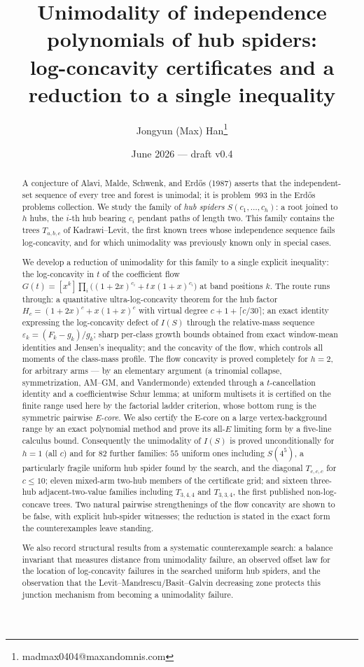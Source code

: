\documentclass[11pt]{article}
\title{Unimodality of independence polynomials of hub spiders:\\
log-concavity certificates and a reduction to a single inequality}
\author{Jongyun (Max) Han\thanks{madmax0404@maxandomnis.com}}
\date{June 2026 --- draft v0.4}
\theoremstyle{definition}
\newcommand{\eps}{\varepsilon}
\begin{document}
\maketitle

\begin{abstract}
A conjecture of Alavi, Malde, Schwenk, and Erd\H{o}s (1987) asserts that
the independent-set sequence of every tree and forest is unimodal; it is
problem~993 in the Erd\H{o}s problems collection.  We study the family of
\emph{hub spiders} $S(c_1,\dots,c_h)$: a root joined to $h$ hubs, the
$i$-th hub bearing $c_i$ pendant paths of length two.  This family
contains the trees $T_{a,b,c}$ of Kadrawi--Levit, the first known trees
whose independence sequence fails log-concavity, and for which
unimodality was previously known only in special cases.

We develop a reduction of unimodality for this family to a single
explicit inequality: the log-concavity in $t$ of the coefficient flow
$G(t)=[x^k]\prod_i\bigl((1+2x)^{c_i}+t\,x(1+x)^{c_i}\bigr)$ at band
positions $k$.  The route runs through: a quantitative
ultra-log-concavity theorem for the hub factor
$H_c=(1+2x)^c+x(1+x)^c$ with virtual degree $c+1+\lceil c/30\rceil$;
an exact identity expressing the log-concavity defect of $I(S)$
through the relative-mass sequence $\eps_k=(F_k-g_k)/g_k$; sharp
per-class growth bounds obtained from exact window-mean identities
and Jensen's inequality; and the concavity of the flow, which
controls all moments of the class-mass profile.  The flow concavity
is proved completely for $h=2$, for arbitrary arms --- by an
elementary argument (a trinomial collapse, symmetrization, AM--GM,
and Vandermonde) extended through a $t$-cancellation identity and a
coefficientwise Schur lemma; at uniform multisets it is certified on
the finite range used here by the factorial ladder criterion, whose
bottom rung is the symmetric pairwise \emph{E-core}.  We also certify
the E-core on a large vertex-background range by an exact polynomial
method and prove its all-$E$ limiting form by a five-line calculus
bound.  Consequently the
unimodality of $I(S)$ is proved unconditionally for $h=1$ (all
$c$) and for $82$ further families: $55$ uniform ones including
$S(4^5)$, a particularly fragile uniform hub spider found by the search, and
the diagonal $T_{c,c,c}$ for $c\le 10$; eleven mixed-arm
two-hub members of the certificate grid; and sixteen three-hub
adjacent-two-value families including $T_{3,4,4}$ and $T_{3,3,4}$,
the first published non-log-concave trees.  Two natural pairwise strengthenings of
the flow concavity are shown to be false, with explicit hub-spider
witnesses; the reduction is stated in the exact form the
counterexamples leave standing.

We also record structural results from a systematic counterexample
search: a balance invariant that measures distance from unimodality
failure, an observed offset law for the location of log-concavity failures
in the searched uniform hub spiders, and the observation that the
Levit--Mandrescu/Basit--Galvin decreasing zone protects this junction
mechanism from becoming a unimodality failure.
\end{abstract}
\end{document}
